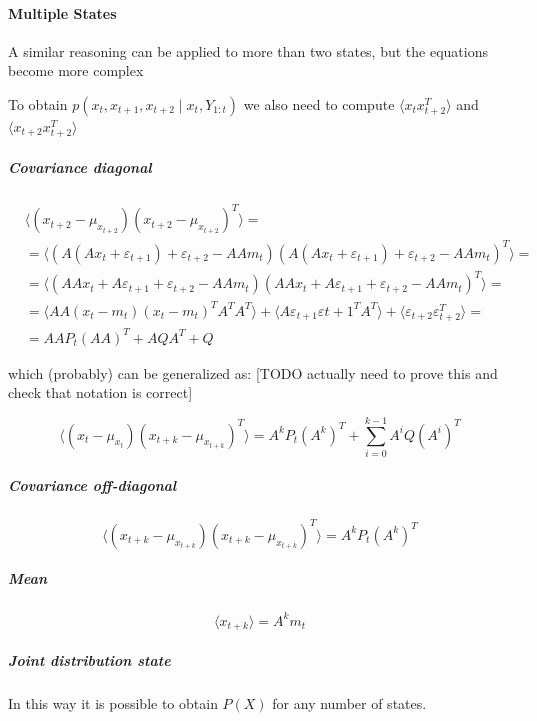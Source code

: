 \documentclass{article}
\newcommand{\E}[1]{\langle #1 \rangle} %
\begin{document}
\paragraph{Multiple States} A similar reasoning can be applied to more than two states, but the equations become more complex

To obtain $p(x_t, x_{t+1}, x_{t+2} \mid x_t, Y_{1:t})$ we also need to compute $\E{x_tx_{t+2}^T}$ and $\E{x_{t+2}x_{t+2}^T}$

\subparagraph{Covariance diagonal}

\begin{equation}\label{eq:cov_x_t_x_t2}
\begin{split}
    &\E{(x_{t+2}-\mu_{x_{t+2}})(x_{t+2}-\mu_{x_{t+2}})^T}=\\
    &= \E{(A(Ax_t + \varepsilon_{t+1}) + \varepsilon_{t+2} - AAm_t)(A(Ax_t + \varepsilon_{t+1}) + \varepsilon_{t+2} - AAm_t)^T} =\\
    &=\E{(AAx_t + A\varepsilon_{t+1} + \varepsilon_{t+2} - AAm_t)(AAx_t + A\varepsilon_{t+1} + \varepsilon_{t+2} - AAm_t)^T}=\\
    &=\E{AA(x_t - m_t)(x_t - m_t)^TA^TA^T} + \E{A\varepsilon_{t+1}\varepsilon{t+1}^TA^T} + \E{\varepsilon_{t+2}\varepsilon_{t+2}^T}=\\
    &=AAP_t(AA)^T + AQA^T + Q
\end{split}
\end{equation}

which (probably) can be generalized as: [TODO actually need to prove this and check that notation is correct]

\begin{equation}
    \E{(x_t -\mu_{x_t})(x_{t+k} - \mu_{x_{t+k}})^T} = A^kP_t(A^k)^T + \sum_{i=0}^{k-1} A^iQ(A^i)^T
\end{equation}

\subparagraph{Covariance off-diagonal}

\begin{equation}
    \E{(x_{t+k} - \mu_{x_{t+k}})(x_{t+k} - \mu_{x_{t+k}})^T} = A^kP_t(A^k)^T
\end{equation}

\subparagraph{Mean}

\begin{equation}
    \E{x_{t+k}} = A^km_t
\end{equation}

\subparagraph{Joint distribution state}
In this way it is possible to obtain $P(X)$ for any number of states.
\end{document}
